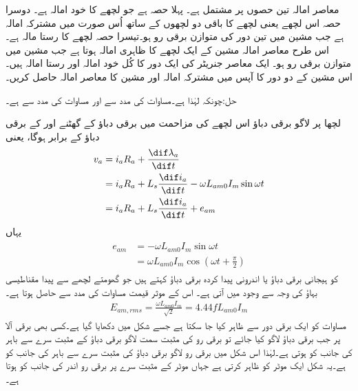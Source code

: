 معاصر امالہ تین حصوں پر مشتمل ہے۔ پہلا حصہ  ہے جو  لچھے کا خود امالہ ہے۔ دوسرا حصہ   اس لچھے یعنی  لچھے کا باقی دو لچھوں کے ساتھ اُس صورت میں مشترکہ امالہ ہے جب مشین میں تین دور کی متوازن برقی رو ہو۔تیسرا حصہ  لچھے   کا رستا مالہ ہے۔ اس طرح معاصر امالہ مشین کے ایک لچھے کا ظاہری امالہ ہوتا ہے جب مشین میں متوازن برقی رو ہو۔
%
ایک معاصر جنریٹر کی ایک دور کا کُل خود امالہ  اور رستا امالہ  ہیں۔اس مشین کے دو دور کا آپس میں مشترکہ امالہ اور مشین کا معاصر امالہ حاصل کریں۔

حل:چونکہ   لہٰذا  ہے۔مساوات  کی مدد سے   اور مساوات  کی مدد سے   ہے۔
%

لچھا  پر لاگو برقی دباؤ اس لچھے کی مزاحمت  میں برقی دباؤ کے گھٹنے اور  کے برقی دباؤ کے برابر ہوگا، یعنی
\begin{gather}
\begin{aligned}
v_a&=i_a R_a+\frac{\dif \lambda_a}{\dif t}\\
&=i_a R_a+L_s \frac{\dif i_a}{\dif t}-\omega L_{am0} I_m \sin \omega t\\
&=i_a R_a+L_s \frac{\dif i_a}{\dif t}+e_{am}
\end{aligned}
\end{gather}
یہاں
\begin{gather}
\begin{aligned}
e_{am}&=-\omega L_{am0} I_m \sin \omega t\\
&=\omega L_{am0} I_m \cos \left (\omega t+\frac{\pi}{2} \right)
\end{aligned}
\end{gather}
کو ہیجانی برقی دباؤ یا اندرونی پیدا کردہ برقی دباؤ کہتے ہیں جو گھومتے لچھے سے پیدا مقناطیسی بہاؤ کی وجہ سے وجود میں آتی ہے۔  اس کے موثر قیمت  مساوات  کی مدد سے حاصل ہوتا ہے۔
\begin{align}
E_{am,rms}=\frac{\omega L_{am0} I_m}{\sqrt{2}}=4.44 f L_{am0} I_m
\end{align}
مساوات  کو ایک برقی دور سے ظاہر کیا جا سکتا ہے جسے شکل  میں دکھایا گیا ہے۔کسی بھی برقی آلا پر جب برقی دباؤ لاگو کیا جائے تو برقی رو کی مثبت سمت لاگو برقی دباؤ کے مثبت سرے سے باہر کی جانب کو ہوتی ہے۔لہٰذا اس شکل میں برقی رو  لاگو برقی دباؤ  کی مثبت سرے سے باہر کی جانب کو ہے۔یہ شکل ایک موٹر کو ظاہر کرتی ہے جہاں موٹر کے مثبت سرے پر برقی رو اندر کی جانب کو ہوتا ہے۔


